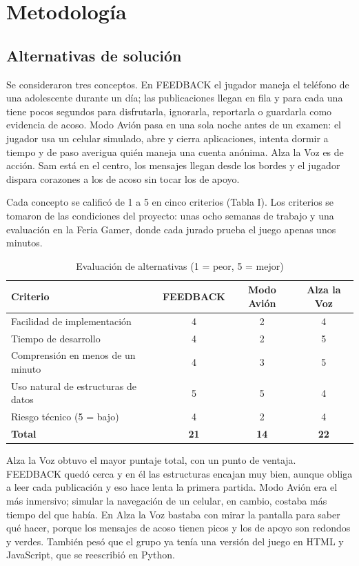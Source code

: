 \documentclass[conference]{IEEEtran}
\begin{document}
\section{Metodología}

\subsection{Alternativas de solución}

Se consideraron tres conceptos. En FEEDBACK el jugador maneja el teléfono de una adolescente durante un día; las publicaciones llegan en fila y para cada una tiene pocos segundos para disfrutarla, ignorarla, reportarla o guardarla como evidencia de acoso. Modo Avión pasa en una sola noche antes de un examen: el jugador usa un celular simulado, abre y cierra aplicaciones, intenta dormir a tiempo y de paso averigua quién maneja una cuenta anónima. Alza la Voz es de acción. Sam está en el centro, los mensajes llegan desde los bordes y el jugador dispara corazones a los de acoso sin tocar los de apoyo.

Cada concepto se calificó de 1 a 5 en cinco criterios (Tabla I). Los criterios se tomaron de las condiciones del proyecto: unas ocho semanas de trabajo y una evaluación en la Feria Gamer, donde cada jurado prueba el juego apenas unos minutos.

\begin{table}[!htbp]
\centering
\caption{Evaluación de alternativas (1 = peor, 5 = mejor)}
\footnotesize
\begin{tabularx}{\columnwidth}{|X|c|c|c|}
\hline
\textbf{Criterio} & \textbf{FEEDBACK} & \textbf{Modo Avión} & \textbf{Alza la Voz} \\ \hline
Facilidad de implementación & 4 & 2 & 4 \\ \hline
Tiempo de desarrollo & 4 & 2 & 5 \\ \hline
Comprensión en menos de un minuto & 4 & 3 & 5 \\ \hline
Uso natural de estructuras de datos & 5 & 5 & 4 \\ \hline
Riesgo técnico (5 = bajo) & 4 & 2 & 4 \\ \hline
\textbf{Total} & \textbf{21} & \textbf{14} & \textbf{22} \\ \hline
\end{tabularx}
\end{table}

Alza la Voz obtuvo el mayor puntaje total, con un punto de ventaja. FEEDBACK quedó cerca y en él las estructuras encajan muy bien, aunque obliga a leer cada publicación y eso hace lenta la primera partida. Modo Avión era el más inmersivo; simular la navegación de un celular, en cambio, costaba más tiempo del que había. En Alza la Voz bastaba con mirar la pantalla para saber qué hacer, porque los mensajes de acoso tienen picos y los de apoyo son redondos y verdes. También pesó que el grupo ya tenía una versión del juego en HTML y JavaScript, que se reescribió en Python.
\end{document}
